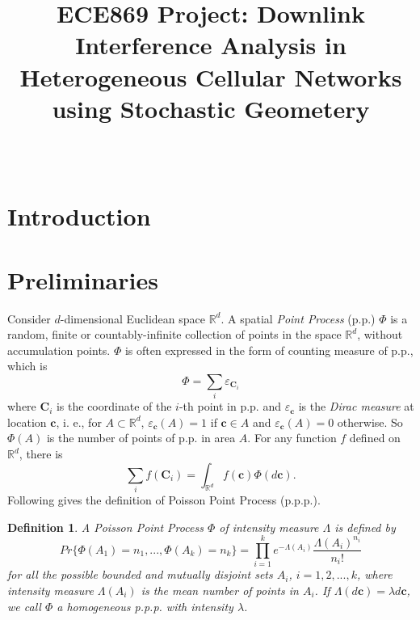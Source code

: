 \documentclass[a4paper,onecolumn,11pt]{IEEEtran}
\newtheorem{definition}{\textbf{Definition}}
\begin{document}
\title{ECE869 Project: Downlink Interference Analysis in Heterogeneous Cellular Networks using Stochastic Geometery}
\author{\\
	\vspace{6pt}
	}
\maketitle
\section{Introduction}

\section{Preliminaries}
Consider $d$-dimensional Euclidean space $\mathbb{R}^d$. A spatial \emph{Point Process} (p.p.) $\Phi$ is a random, finite or countably-infinite collection of points in the space $\mathbb{R}^d$, without accumulation points. $\Phi$ is often expressed in the form of counting measure of p.p., which is
\begin{displaymath}
\Phi = \sum_i \varepsilon_{\bm{C}_i}
\end{displaymath} 
where $\bm{C}_i$ is the coordinate of the $i$-th point in p.p. and $\varepsilon_{\bm{c}}$ is the \emph{Dirac measure} at location $\bm{c}$, i. e., for $A \subset \mathbb{R}^d$, $\varepsilon_{\bm{c}}(A)=1$ if $\bm{c} \in A$ and $\varepsilon_{\bm{c}}(A)=0$ otherwise. So $\Phi(A)$ is the number of points of p.p. in area $A$. For any function $f$ defined on $\mathbb{R}^d$, there is   
\begin{displaymath}
\sum_i f(\bm{C}_i) = \int_{\mathbb{R}^d}f(\bm{c})\Phi(d\bm{c}).
\end{displaymath}
Following gives the definition of Poisson Point Process (p.p.p.).
\begin{definition}
A Poisson Point Process $\Phi$ of intensity measure $\Lambda$ is defined by
\begin{equation}
Pr\{\Phi(A_1) = n_1, ..., \Phi(A_k) = n_k\} = \prod_{i=1}^{k} e^{-\Lambda(A_i)}\frac{\Lambda(A_i)^{n_i}}{n_i !}
\end{equation}
for all the possible bounded and mutually disjoint sets $A_i$, $i = 1,2, ..., k$, where intensity measure $\Lambda(A_i)$ is the mean number of points in $A_i$. If $\Lambda(d\bm{c}) = \lambda d\bm{c}$, we call $\Phi$ a homogeneous p.p.p. with intensity $\lambda$.  
\end{definition}
\end{document}
